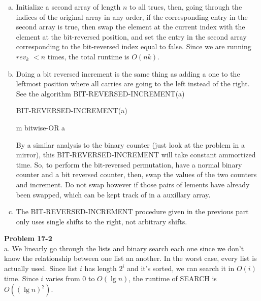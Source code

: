 \documentclass{article}
\begin{document}
\begin{enumerate}[a.]
\item
Initialize a second array of length $n$ to all trues, then, going through the indices of the original array in any order, if  the corresponding entry in the second array is true, then swap the element at the current index with the element at the bit-reversed position, and set the entry in the second array corresponding to the bit-reversed index equal to false. Since we are running $rev_k$ $< n$ times, the total runtime is $O(nk)$.
\item
Doing a bit reversed increment is the same thing as adding a one to the leftmost position where all carries are going to the left instead of the right. See the algorithm BIT-REVERSED-INCREMENT(a)

\begin{algorithm}
\caption{BIT-REVERSED-INCREMENT(a)}
\begin{algorithmic}
\EndWhile
\Return m bitwise-OR a
\end{algorithmic}
\end{algorithm}

By a similar analysis to the binary counter (just look at the problem in a mirror), this BIT-REVERSED-INCREMENT will take constant ammortized time. So, to perform the bit-reversed permutation, have a normal binary counter and a bit reversed counter, then, swap the values of the two counters and increment. Do not swap however if those pairs of lements have already been swapped, which can be kept track of in a auxillary array.

\item The BIT-REVERSED-INCREMENT procedure given in the previous part only uses single shifts to the right, not arbitrary shifts.

\end{enumerate}

\noindent\textbf{Problem 17-2}\\

a. We linearly go through the lists and binary search each one since we don't know the relationship between one list an another.  In the worst case, every list is actually used.  Since list $i$ has length $2^i$ and it's sorted, we can search it in $O(i)$ time.  Since $i$ varies from 0 to $O(\lg n)$, the runtime of SEARCH is $O((\lg n)^2)$. \\
\end{document}

